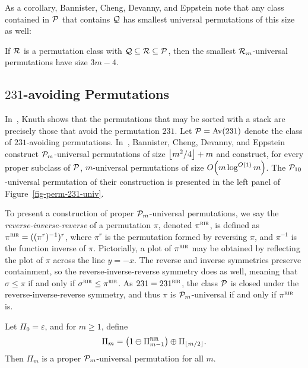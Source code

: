 As a corollary, Bannister, Cheng, Devanny, and Eppstein note that any class contained in $\P$ that contains $\Q$ has smallest universal permutations of this size as well:
\begin{corollary}
	If $\R$ is a permutation class with $\Q \subseteq \R \subseteq \P$, then the smallest $\R_m$-universal permutations have size $3m-4$.
\end{corollary}

\subsection{\texorpdfstring{$231$}{231}-avoiding Permutations}

In~\cite{knuth:the-art-of-comp:1}, Knuth shows that the permutations that may be sorted with a stack are precisely those that avoid the permutation $231$. Let $\P = \Av(231)$ denote the class of $231$-avoiding permutations. In~\cite{bannister:superpatterns-a:}, Bannister, Cheng, Devanny, and Eppstein construct $\P_m$-universal permutations of size $\floor{m^2/4} + m$ and construct, for every proper subclass of $\P$, $m$-universal permutations of size $\oO{m \log^{\oO{1}}m}$. The $\P_{10}$-universal permutation of their construction is presented in the left panel of Figure~\ref{fig-perm-231-univ}.

To present a construction of proper $\P_m$-universal permutations, we say the \emph{reverse-inverse-reverse} of a permutation $\pi$, denoted $\pi^{\rir}$, is defined as $\pi^{\rir} = ((\pi^{r})^{-1})^{r}$, where $\pi^r$ is the permutation formed by reversing $\pi$, and $\pi^{-1}$ is the function inverse of $\pi$. Pictorially, a plot of $\pi^{\rir}$ may be obtained by reflecting the plot of $\pi$ across the line $y = -x$. The reverse and inverse symmetries preserve containment, so the reverse-inverse-reverse symmetry does as well, meaning that $\sigma \le \pi$ if and only if $\sigma^{\rir} \le \pi^{\rir}$. As $231 = 231^{\rir}$, the class $\P$ is closed under the reverse-inverse-reverse symmetry, and thus $\pi$ is $\P_m$-universal if and only if $\pi^{\rir}$ is.

\begin{proposition}
\label{prop-perm-231-proper}
Let $\Pi_0 = \varepsilon$, and for $m \ge 1$, define
\[
	\Pi_m
	=
	\left(1 \skewsum \Pi_{m-1}^{\rir}\right) \directsum \Pi_{\floor{m/2}}.
\]
Then $\Pi_{m}$ is a proper $\P_m$-universal permutation for all $m$.
\end{proposition}

